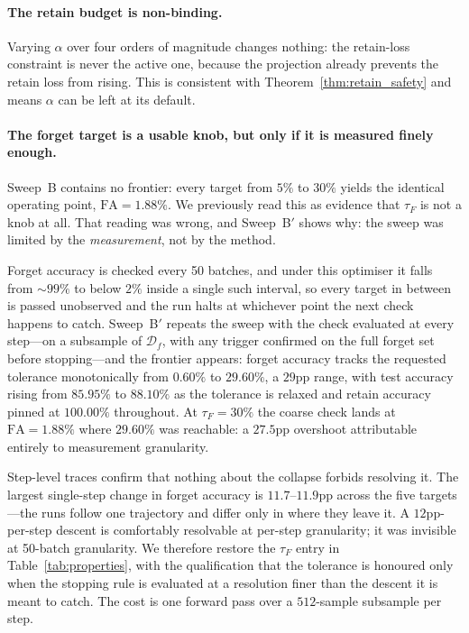 \documentclass{article}
\newcommand{\Df}{\mathcal{D}_f}
\theoremstyle{remark}
\theoremstyle{plain}
\begin{document}
\paragraph{The retain budget is non-binding.}
Varying $\alpha$ over four orders of magnitude changes nothing: the retain-loss
constraint is never the active one, because the projection already prevents the
retain loss from rising. This is consistent with Theorem~\ref{thm:retain_safety}
and means $\alpha$ can be left at its default.

\paragraph{The forget target is a usable knob, but only if it is measured
finely enough.} Sweep~B contains no frontier: every target from $5\%$ to $30\%$
yields the identical operating point, $\mathrm{FA} = 1.88\%$. We previously read
this as evidence that $\tau_F$ is not a knob at all. That reading was wrong,
and Sweep~B$'$ shows why: the sweep was limited by the \emph{measurement}, not
by the method.

Forget accuracy is checked every 50 batches, and under this optimiser it falls
from ${\sim}99\%$ to below $2\%$ inside a single such interval, so every target
in between is passed unobserved and the run halts at whichever point the next
check happens to catch. Sweep~B$'$ repeats the sweep with the check evaluated at
every step---on a subsample of $\Df$, with any trigger confirmed on the full
forget set before stopping---and the frontier appears: forget accuracy tracks
the requested tolerance monotonically from $0.60\%$ to $29.60\%$, a $29$pp
range, with test accuracy rising from $85.95\%$ to $88.10\%$ as the tolerance is
relaxed and retain accuracy pinned at $100.00\%$ throughout. At
$\tau_F = 30\%$ the coarse check lands at $\mathrm{FA} = 1.88\%$ where
$29.60\%$ was reachable: a $27.5$pp overshoot attributable entirely to
measurement granularity.

Step-level traces confirm that nothing about the collapse forbids resolving it.
The largest single-step change in forget accuracy is $11.7$--$11.9$pp across
the five targets---the runs follow one trajectory and differ only in where they
leave it. A $12$pp-per-step descent is comfortably resolvable at
per-step granularity; it was invisible at 50-batch granularity. We therefore
restore the $\tau_F$ entry in Table~\ref{tab:properties}, with the
qualification that the tolerance is honoured only when the stopping rule is
evaluated at a resolution finer than the descent it is meant to catch. The cost
is one forward pass over a $512$-sample subsample per step.
\end{document}
